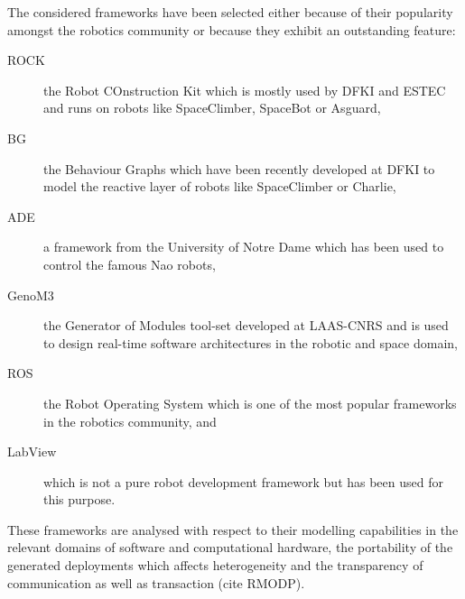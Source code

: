 \documentclass[a4paper,twocolumn]{esapub2005} %
\begin{document}
The considered frameworks have been selected either because of their popularity amongst the robotics community or because they exhibit an outstanding feature:
\begin{description}
    \item[ROCK] the Robot COnstruction Kit which is mostly used by DFKI and ESTEC and runs on robots like SpaceClimber, SpaceBot or Asguard\cite{ROCK},
    \item[BG] the Behaviour Graphs which have been recently developed at DFKI to model the reactive layer of robots like SpaceClimber or Charlie\cite{2012_Langosz},
    \item[ADE] a framework from the University of Notre Dame which has been used to control the famous Nao robots\cite{Scheutz},
    \item[GenoM3] the Generator of Modules tool-set developed at LAAS-CNRS and is used to design real-time software architectures in the robotic and space domain\cite{2015_Genom3},
    \item[ROS] the Robot Operating System which is one of the most popular frameworks in the robotics community\cite{ROS}, and
    \item[LabView] which is not a pure robot development framework but has been used for this purpose\cite{2010_Muecke}.
\end{description}
These frameworks are analysed with respect to their modelling capabilities in the relevant domains of software and computational hardware, the portability of the generated deployments which affects heterogeneity and the transparency of communication as well as transaction (cite RMODP).

\end{document}
